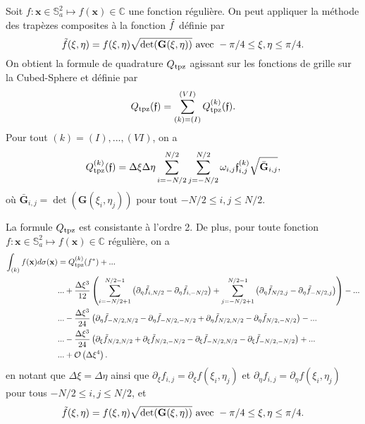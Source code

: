 Soit $f : \mathbf{x} \in \mathbb{S}_a^2 \mapsto f(\mathbf{x}) \in \mathbb{C}$ une fonction régulière. On peut appliquer la méthode des trapèzes composites à la fonction $\tilde{f}$ définie par
\begin{equation}
\tilde{f}(\xi,\eta) = f(\xi,\eta) \sqrt{\det(\mathbf{G}(\xi,\eta))} \text{ avec } -\pi/4 \leq \xi,\eta \leq \pi/4.
\end{equation}
On obtient la formule de quadrature $Q_{\text{tpz}}$ agissant sur les fonctions de grille sur la Cubed-Sphere et définie par
\begin{equation}
Q_{\text{tpz}}(\mathfrak{f}) = \displaystyle\sum\limits_{(k) = (I)}^{(VI)}Q_{\text{tpz}}^{(k)}(\mathfrak{f}).
\end{equation}
Pour tout $(k) = (I), ..., (VI)$, on a
\begin{equation}
Q_{\text{tpz}}^{(k)}(\mathfrak{f}) = \Delta \xi \Delta \eta \displaystyle\sum\limits_{i=-N/2}^{N/2} \displaystyle\sum\limits_{j=-N/2}^{N/2} \omega_{i,j} \mathfrak{f}_{i,j}^{(k)} \sqrt{\bar{\mathbf{G}}_{i,j}},
\end{equation}
où $\bar{\mathbf{G}}_{i,j}=\det(\mathbf{G}(\xi_i,\eta_j))$ pour tout $-N/2 \leq i,j \leq N/2$.

\begin{theoreme}
La formule $Q_{\text{tpz}}$ est consistante à l'ordre 2. De plus, pour toute fonction $f : \mathbf{x} \in \mathbb{S}_a^2 \mapsto f(\mathbf{x}) \in \mathbb{C}$ régulière, on a
\begin{align*}
\displaystyle\int_{(k)} f(\mathbf{x})d\sigma(\mathbf{x}) & = Q_{\text{tpz}}^{(k)}(f^*) + ... \\
& ... + \dfrac{\Delta \xi^3}{12} \left( \displaystyle\sum\limits_{i=-N/2+1}^{N/2-1} \left( \partial_{\eta}\tilde{f}_{i, N/2} - \partial_{\eta}\tilde{f}_{i, -N/2} \right) + \displaystyle\sum\limits_{j=-N/2+1}^{N/2-1} \left( \partial_{\eta}\tilde{f}_{N/2,j} - \partial_{\eta}\tilde{f}_{-N/2,j} \right) \right) - ...  \\
	&  ... - \dfrac{\Delta \xi^3}{24} \left( \partial_{\eta}\tilde{f}_{-N/2,N/2} - \partial_{\eta}\tilde{f}_{-N/2,-N/2} + \partial_{\eta}\tilde{f}_{N/2,N/2}  - \partial_{\eta}\tilde{f}_{N/2,-N/2} \right) - ...  \\
& ... - \dfrac{\Delta \xi^3}{24} \left( \partial_{\xi}\tilde{f}_{N/2,N/2} + \partial_{\xi}\tilde{f}_{N/2,-N/2} - \partial_{\xi}\tilde{f}_{-N/2,N/2}  - \partial_{\xi}\tilde{f}_{-N/2,-N/2} \right)+...\\
& ... + \mathcal{O} \left( \Delta \xi^4 \right).
\end{align*}
en notant que $\Delta \xi = \Delta \eta$ ainsi que $\partial _{\xi} f_{i,j} = \partial_{\xi}f(\xi_i, \eta_j)$ et $\partial _{\eta} f_{i,j} = \partial_{\eta}f(\xi_i, \eta_j)$ pour tous $-N/2 \leq i,j \leq N/2$, et
\begin{equation}
\tilde{f}(\xi,\eta) = f(\xi,\eta) \sqrt{\det(\mathbf{G}(\xi,\eta))} \text{ avec } -\pi/4 \leq \xi,\eta \leq \pi/4.
\end{equation}
\label{th:quadrature_tpz}
\end{theoreme}

